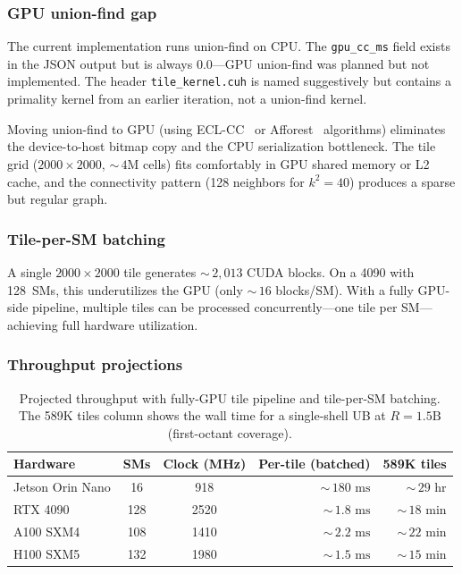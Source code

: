 \documentclass[11pt,a4paper]{article}
\theoremstyle{definition}
\theoremstyle{plain}
\theoremstyle{remark}
\begin{document}
\subsubsection{GPU union-find gap}

The current implementation runs union-find on CPU\@.  The \texttt{gpu\_cc\_ms} field exists in the JSON output but is always $0.0$---GPU union-find was planned but not implemented.  The header \texttt{tile\_kernel.cuh} is named suggestively but contains a primality kernel from an earlier iteration, not a union-find kernel.

Moving union-find to GPU (using ECL-CC~\cite{jaiganesh2018} or Afforest~\cite{sutton2018} algorithms) eliminates the device-to-host bitmap copy and the CPU serialization bottleneck.  The tile grid ($2000 \times 2000$, ${\sim}\,4\text{M}$ cells) fits comfortably in GPU shared memory or L2 cache, and the connectivity pattern (128 neighbors for $k^2 = 40$) produces a sparse but regular graph.

\subsubsection{Tile-per-SM batching}

A single $2000 \times 2000$ tile generates ${\sim}\,2{,}013$ CUDA blocks.  On a 4090 with 128~SMs, this underutilizes the GPU (only ${\sim}\,16$ blocks/SM).  With a fully GPU-side pipeline, multiple tiles can be processed concurrently---one tile per SM---achieving full hardware utilization.

\subsubsection{Throughput projections}

\begin{table}[ht]
\centering
\begin{tabular}{@{}lccrr@{}}
\toprule
Hardware & SMs & Clock (MHz) & Per-tile (batched) & 589K tiles \\
\midrule
Jetson Orin Nano & 16  & 918  & ${\sim}\,180\text{ ms}$ & ${\sim}\,29\text{ hr}$ \\
RTX 4090         & 128 & 2520 & ${\sim}\,1.8\text{ ms}$ & ${\sim}\,18\text{ min}$ \\
A100 SXM4        & 108 & 1410 & ${\sim}\,2.2\text{ ms}$ & ${\sim}\,22\text{ min}$ \\
H100 SXM5        & 132 & 1980 & ${\sim}\,1.5\text{ ms}$ & ${\sim}\,15\text{ min}$ \\
\bottomrule
\end{tabular}
\caption{Projected throughput with fully-GPU tile pipeline and tile-per-SM batching.  The 589K tiles column shows the wall time for a single-shell UB at $R = 1.5\text{B}$ (first-octant coverage).}
\label{tab:throughput-projection}
\end{table}
\end{document}
